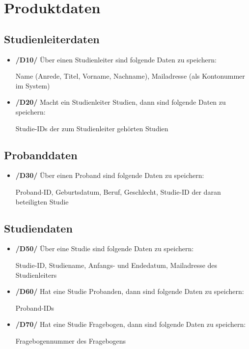 \documentclass[a4paper]{scrreprt}
\begin{document}
    \chapter{Produktdaten}
        \section{\gls{Studienleiter}daten}
            \begin{itemize}
                \item \textbf{/D10/} Über einen \gls{Studienleiter} sind folgende Daten zu speichern:
                    \par Name (Anrede, Titel, Vorname, Nachname), Mailadresse (als Kontonummer im System)

                \item \textbf{/D20/} Macht ein \gls{Studienleiter} Studien, dann sind folgende Daten zu speichern:
                    \par Studie-IDs der zum \gls{Studienleiter} gehörten Studien
            \end{itemize}

        \section{\gls{Proband}daten}
            \begin{itemize}
                \item \textbf{/D30/} Über einen \gls{Proband} sind folgende Daten zu speichern:
                    \par \gls{Proband}-ID, Geburtsdatum, Beruf, Geschlecht, Studie-ID der daran beteiligten Studie
            \end{itemize}

        \section{Studiendaten}
            \begin{itemize}
                \item \textbf{/D50/} Über eine Studie sind folgende Daten zu speichern:
                    \par Studie-ID, Studiename, Anfangs- und Endedatum, Mailadresse des \gls{Studienleiter}s

                \item \textbf{/D60/} Hat eine Studie \gls{Proband}en, dann sind folgende Daten zu speichern:
                    \par \gls{Proband}-IDs

                \item \textbf{/D70/} Hat eine Studie Fragebogen, dann sind folgende Daten zu speichern:
                    \par Fragebogennummer des Fragebogens
            \end{itemize}
\end{document}
